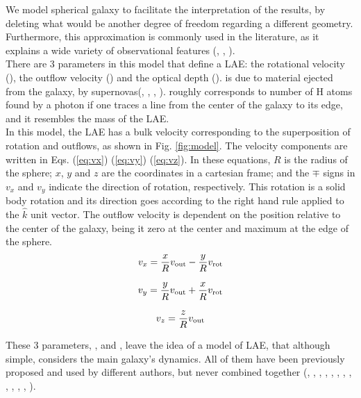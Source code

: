 \documentclass[twocolappendix]{latex/emulateapj}
\begin{document}
We model spherical galaxy to facilitate the interpretation of the results, by deleting what would be another degree of freedom regarding a different geometry. Furthermore, this approximation is commonly used in the literature, as it explains a wide variety of observational features (\cite{Ahn03}, \cite{Verhamme06}, \cite{Dijkstra06}). \\

There are 3 parameters in this model that define a LAE: the rotational velocity (\vrot), the outflow velocity (\vout) and the optical depth (\tauh). \vout is due to material ejected from the galaxy, by supernovas(\cite{Verhamme06}, \cite{Orsi12}, \cite{Hashimoto2015}, \cite{Gronke2015}). \tauh roughly corresponds to number of H atoms found by a \lya photon if one traces a line from the center of the galaxy to its edge, and it resembles the mass of the LAE.\\

In this model, the LAE has a bulk velocity corresponding to the superposition of rotation and outflows, as shown in Fig. \ref{fig:model}. The velocity components are written in Eqs. (\ref{eq:vx}) (\ref{eq:vy}) (\ref{eq:vz}). In these equations, $R$ is the radius of the sphere; $x$, $y$ and $z$ are the coordinates in a cartesian frame; and the $\mp$ signs in $v_x$ and $v_y$ indicate the direction of rotation, respectively. This rotation is a solid body rotation and its direction goes according to the right hand rule applied to the $\hat{k}$ unit vector. The outflow velocity is dependent on the position relative to the center of the galaxy, being it zero at the center and maximum at the edge of the sphere.\\

\begin{equation}
	v_{x}=\frac{x}{R}v_{\rm out}-\frac{y}{R}v_{\rm rot} 
	\label{eq:vx}
\end{equation}

\begin{equation}
	v_{y}=\frac{y}{R}v_{\rm out}+\frac{x}{R}v_{\rm rot} 
	\label{eq:vy}
\end{equation}

\begin{equation}
	v_{z}=\frac{z}{R}v_{\rm out}
	\label{eq:vz}
\end{equation}

These 3 parameters, \vrot, \vout and \tauh, leave the idea of a model of LAE, that although simple, considers the main galaxy's dynamics. All of them have been previously proposed and used by different authors, but never combined together (\cite{Adams72}, \cite{Harrington73}, \cite{Neufeld90}, \cite{Dijkstra06}, \cite{Verhamme06}, \cite{Forero12}, \cite{Martin2015}, \cite{Garavito14}, \cite{Neufeld91}, \cite{Laursen09}, \cite{Barnes11}, \cite{Verhamme12}, \cite{Yajima12}).\\
\end{document}
